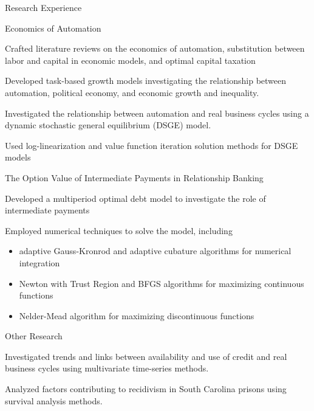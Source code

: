 \documentclass{resume} %
\begin{document}
\begin{rSection}{Research Experience}
    \begin{rSubsection}{Economics of Automation}{}{}{}
        \item Crafted literature reviews on the economics of automation, substitution between labor and capital in economic models, and optimal capital taxation
        \item Developed task-based growth models investigating the relationship between automation, political economy, and economic growth and inequality.
        \item Investigated the relationship between automation and real business cycles using a dynamic stochastic general equilibrium (DSGE) model.
        \item Used log-linearization and value function iteration solution methods for DSGE models
    \end{rSubsection}

    \begin{rSubsection}{The Option Value of Intermediate Payments in Relationship Banking}{}{}{}
        \item Developed a multiperiod optimal debt model to investigate the role of intermediate payments
        \item Employed numerical techniques to solve the model, including 
        \begin{itemize}
            \item adaptive Gauss-Kronrod and adaptive cubature algorithms for numerical integration
            \item Newton with Trust Region and BFGS algorithms for maximizing continuous functions
            \item Nelder-Mead algorithm for maximizing discontinuous functions
        \end{itemize}
    \end{rSubsection}

    \begin{rSubsection}{Other Research}{}{}{}
        \item Investigated trends and links between availability and use of credit and real business cycles using multivariate time-series methods.
        \item Analyzed factors contributing to recidivism in South Carolina prisons using survival analysis methods.
    \end{rSubsection}
\end{rSection}
\end{document}
